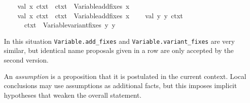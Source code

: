 \begin{isabellebody}
\ \ \ \ val\ {}{}x{}{}{}\ ctxt{}{}\ {}\ ctxt{}\ {}{}\ Variable{}add{}fixes\ {}{}x{}{}{}\isanewline
\ \ \ \ val\ {}{}x{}{}{}\ ctxt{}{}\ {}\ ctxt{}\ {}{}\ Variable{}add{}fixes\ {}{}x{}{}{}\isanewline
\isanewline
\ \ \ \ val\ {}{}y{}{}\ y{}{}{}\ ctxt{}{}\ {}\isanewline
\ \ \ \ \ \ ctxt{}\ {}{}\ Variable{}variant{}fixes\ {}{}y{}{}\ {}y{}{}{}\isanewline
\ \ {}\isanewline
\ \ \isamarkupfalse%
%
\endisatagML
{\isafoldML}%
%
\isadelimML
%
\endisadelimML
%
\begin{isamarkuptext}%
In this situation \verb|Variable.add_fixes| and \verb|Variable.variant_fixes| are very similar, but identical name
  proposals given in a row are only accepted by the second version.%
\end{isamarkuptext}%
\isamarkuptrue%
%
\isamarkuptrue%
%
\begin{isamarkuptext}%
An \emph{assumption} is a proposition that it is postulated in the
  current context.  Local conclusions may use assumptions as
  additional facts, but this imposes implicit hypotheses that weaken
  the overall statement.


\end{isamarkuptext}
\end{isabellebody}
